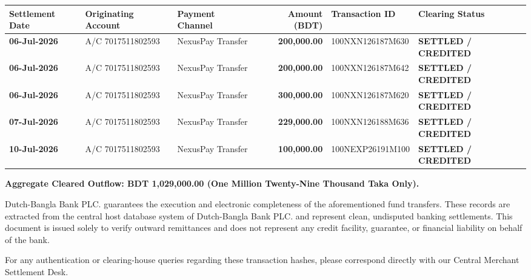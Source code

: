 \documentclass[10pt, a4paper]{article}
\begin{document}
\vspace{4mm}
\noindent
\small
\begin{tabularx}{\textwidth}{l p{3.2cm} l r l p{3.5cm}}
    \toprule
    \textbf{Settlement Date} & \textbf{Originating Account} & \textbf{Payment Channel} & \textbf{Amount (BDT)} & \textbf{Transaction ID} & \textbf{Clearing Status} \\
    \midrule
    \textbf{06-Jul-2026} & A/C 7017511802593 & NexusPay Transfer & \textbf{200,000.00} & 100NXN126187M630 & \textcolor{dbblgreen}{\textbf{SETTLED / CREDITED}} \\
    \textbf{06-Jul-2026} & A/C 7017511802593 & NexusPay Transfer & \textbf{200,000.00} & 100NXN126187M642 & \textcolor{dbblgreen}{\textbf{SETTLED / CREDITED}} \\
    \textbf{06-Jul-2026} & A/C 7017511802593 & NexusPay Transfer & \textbf{300,000.00} & 100NXN126187M620 & \textcolor{dbblgreen}{\textbf{SETTLED / CREDITED}} \\
    \textbf{07-Jul-2026} & A/C 7017511802593 & NexusPay Transfer & \textbf{229,000.00} & 100NXN126188M636 & \textcolor{dbblgreen}{\textbf{SETTLED / CREDITED}} \\
    \textbf{10-Jul-2026} & A/C 7017511802593 & NexusPay Transfer & \textbf{100,000.00} & 100NEXP26191M100 & \textcolor{dbblgreen}{\textbf{SETTLED / CREDITED}} \\
    \bottomrule
\end{tabularx}

\vspace{5mm}
\noindent
\normalsize
\textbf{Aggregate Cleared Outflow: BDT 1,029,000.00 (One Million Twenty-Nine Thousand Taka Only).}

\vspace{4mm}
\begin{tcolorbox}[colback=lightgray, colframe=dbblgreen, boxrule=0.5pt, title=\textbf{Official Banking Declaration}]
    \fontsize{8.5}{11}\selectfont
    Dutch-Bangla Bank PLC. guarantees the execution and electronic completeness of the aforementioned fund transfers. These records are extracted from the central host database system of Dutch-Bangla Bank PLC. and represent clean, undisputed banking settlements. This document is issued solely to verify outward remittances and does not represent any credit facility, guarantee, or financial liability on behalf of the bank.
\end{tcolorbox}

\vspace{5mm}
\noindent
For any authentication or clearing-house queries regarding these transaction hashes, please correspond directly with our Central Merchant Settlement Desk.
\end{document}
